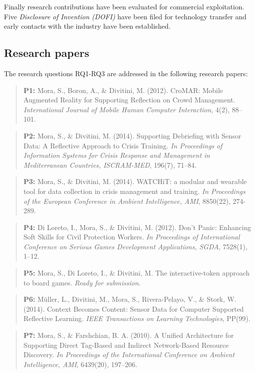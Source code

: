 Finally research contributions have been evaluated for commercial exploitation. Five \emph{Disclosure of Invention (DOFI)} have been filed for technology transfer and early contacts with the industry have been established.

\subsection{Research papers}\label{research-papers}

The research questions RQ1-RQ3 are addressed in the following research papers:
\begin{quote}
	\textbf{P1:} Mora, S., Boron, A., \& Divitini, M. (2012). CroMAR: Mobile Augmented Reality for Supporting Reflection on Crowd Management. \emph{International Journal of Mobile Human Computer Interaction}, 4(2), 88--101. 
\end{quote}
\begin{quote}
	\textbf{P2:} Mora, S., \& Divitini, M. (2014). Supporting Debriefing with Sensor Data: A Reflective Approach to Crisis Training. \emph{In Proceedings of Information Systems for Crisis Response and Management in Mediterranean Countries, ISCRAM-MED}, 196(7), 71--84. 
\end{quote}
\begin{quote}
	\textbf{P3:} Mora, S., \& Divitini, M. (2014). WATCHiT: a modular and wearable tool for data collection in crisis management and training. \emph{In Proceedings of the European Conference in Ambient Intelligence, AMI}, 8850(22), 274-289. 
\end{quote}
\begin{quote}
	\textbf{P4:} Di Loreto, I., Mora, S., \& Divitini, M. (2012). Don't Panic: Enhancing Soft Skills for Civil Protection Workers. \emph{In Proceedings of International Conference on Serious Games Development Applications, SGDA}, 7528(1), 1--12. 
\end{quote}
\begin{quote}
	\textbf{P5:} Mora, S., Di Loreto, I., \& Divitini, M. The interactive-token approach to board games. \emph{Ready for submission}. 
\end{quote}
\begin{quote}
	\textbf{P6:} Müller, L., Divitini, M., Mora, S., Rivera-Pelayo, V., \& Stork, W. (2014). Context Becomes Content: Sensor Data for Computer Supported Reflective Learning. \emph{IEEE Transactions on Learning Technologies}, PP(99). 
\end{quote}
\begin{quote}
	\textbf{P7:} Mora, S., \& Farshchian, B. A. (2010). A Unified Architecture for Supporting Direct Tag-Based and Indirect Network-Based Resource Discovery. \emph{In Proceedings of the International Conference on Ambient Intelligence, AMI}, 6439(20), 197--206. 
\end{quote}


